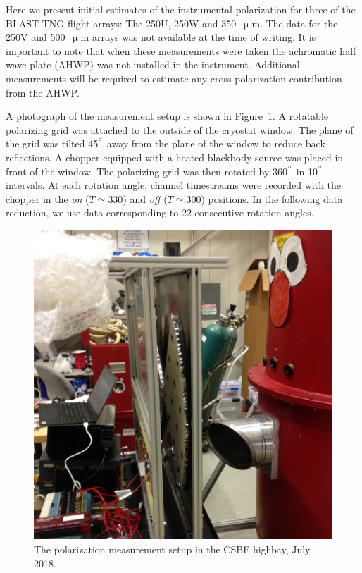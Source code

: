 Here we present initial estimates of the instrumental polarization for three of the BLAST-TNG flight arrays: The 250U, 250W and 350~$\upmu$m. The data for the 250V and 500~$\upmu$m arrays was not available at the time of writing. It is important to note that when these measurements were taken the achromatic half wave plate (AHWP) was not installed in the instrument. Additional measurements will be required to estimate any cross-polarization contribution from the AHWP\@.

A photograph of the measurement setup is shown in Figure~\ref{fig:pol setup}. A rotatable polarizing grid was attached to the outside of the cryostat window. The plane of the grid was tilted 45$^{\degree}$ away from the plane of the window to reduce back reflections. A chopper equipped with a heated blackbody source was placed in front of the window. The polarizing grid was then rotated by 360$^{\degree}$ in 10$^{\degree}$ intervals. At each rotation angle, channel timestreams were recorded with the chopper in the \textit{on} ($T \simeq 330$) and \textit{off} ($T \simeq 300$) positions. In the following data reduction, we use data corresponding to 22 consecutive rotation angles.

\begin{figure}[!htbp]
\centering
\includegraphics[width=\textwidth]{figures/blast_data/polarization/pol_meas_crop}
\caption[~The polarization measurement setup in the CSBF highbay, July 2018.]{The polarization measurement setup in the CSBF highbay, July, 2018.}
\label{fig:pol setup}
\end{figure}

